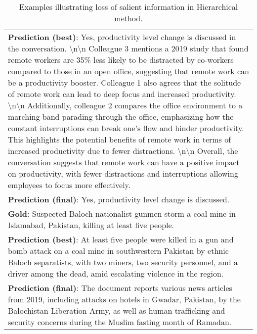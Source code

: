 \begin{table*}
{\begin{tabular}{p{24cm}}
    \textbf{Prediction (best)}: Yes, productivity level change is discussed in the conversation. \textbackslash n\textbackslash n Colleague 3 mentions a 2019 study that found remote workers are 35\% less likely to be distracted by co-workers compared to those in an open office, suggesting that remote work can be a productivity booster. Colleague 1 also agrees that the solitude of remote work can lead to deep focus and increased productivity. \textbackslash n\textbackslash n Additionally, colleague 2 compares the office environment to a marching band parading through the office, emphasizing how the constant interruptions can break one's flow and hinder productivity. This highlights the potential benefits of remote work in terms of increased productivity due to fewer distractions. \textbackslash n\textbackslash n Overall, the conversation suggests that remote work can have a positive impact on productivity, with fewer distractions and interruptions allowing employees to focus more effectively. \\
    \textbf{Prediction (final)}: Yes, productivity level change is discussed. \\
    \midrule
    \textbf{Gold}: Suspected Baloch nationalist gunmen storm a coal mine in Islamabad, Pakistan, killing at least five people. \\
    \textbf{Prediction (best)}: At least five people were killed in a gun and bomb attack on a coal mine in southwestern Pakistan by ethnic Baloch separatists, with two miners, two security personnel, and a driver among the dead, amid escalating violence in the region. \\
    \textbf{Prediction (final)}: The document reports various news articles from 2019, including attacks on hotels in Gwadar, Pakistan, by the Balochistan Liberation Army, as well as human trafficking and security concerns during the Muslim fasting month of Ramadan. \\
    \midrule
    \bottomrule
    \end{tabular}}
    \caption{Examples illustrating loss of salient information in Hierarchical method.}
    \label{tab:qual_hierarchical}
\end{table*}